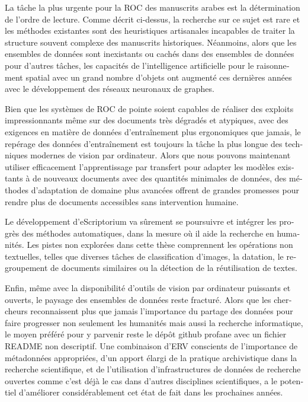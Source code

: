 \begin{french}
La tâche la plus urgente pour la ROC des manuscrits arabes est la détermination
de l'ordre de lecture. Comme décrit ci-dessus, la recherche sur ce sujet est
rare et les méthodes existantes sont des heuristiques artisanales incapables de
traiter la structure souvent complexe des manuscrits historiques. Néanmoins, alors que les
ensembles de données sont inexistants ou cachés dans des
ensembles de données pour d'autres tâches, les capacités de l'intelligence
artificielle pour le raisonnement spatial avec un grand nombre d'objets ont
augmenté ces dernières années avec le développement des réseaux neuronaux de
graphes.

Bien que les systèmes de ROC de pointe soient capables de réaliser des exploits
impressionnants même sur des documents très dégradés et atypiques, avec des
exigences en matière de données d'entraînement plus ergonomiques que jamais, le
repérage des données d'entraînement est toujours la tâche la plus longue des
techniques modernes de vision par ordinateur. Alors que nous pouvons maintenant
utiliser efficacement l'apprentissage par transfert pour adapter les modèles
existants à de nouveaux documents avec des quantités minimales de données, des
méthodes d'adaptation de domaine plus avancées offrent de grandes promesses
pour rendre plus de documents accessibles sans intervention humaine.

Le développement d'eScriptorium va sûrement se poursuivre et intégrer les
progrès des méthodes automatiques, dans la mesure où il aide la recherche en
humanités. Les pistes non explorées dans cette thèse comprennent les
opérations non textuelles, telles que diverses tâches de classification
d'images, la datation, le regroupement de documents similaires ou la détection
de la réutilisation de textes.

Enfin, même avec la disponibilité d'outils de vision par ordinateur puissants
et ouverts, le paysage des ensembles de données reste fracturé. Alors que les
chercheurs reconnaissent plus que jamais l'importance du partage des données
pour faire progresser non seulement les humanités mais aussi la
recherche informatique, le moyen préféré pour y parvenir reste le dépôt github
profane avec un fichier README non descriptif. Une combinaison d'ERV conscients
de l'importance de métadonnées appropriées, d'un apport élargi de la pratique
archivistique dans la recherche scientifique, et de l'utilisation
d'infrastructures de données de recherche ouvertes comme c'est déjà le cas dans
d'autres disciplines scientifiques, a le potentiel d'améliorer considérablement
cet état de fait dans les prochaines années.

\end{french}

